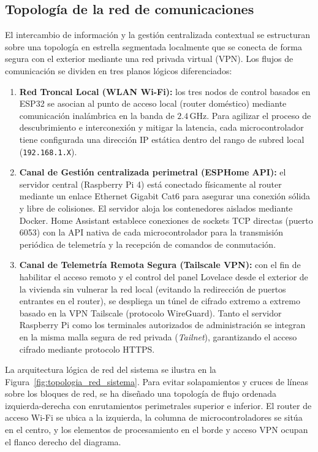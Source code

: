 \subsection{Topología de la red de comunicaciones}
\label{sec:topologia_red}

El intercambio de información y la gestión centralizada contextual se estructuran sobre una topología en estrella segmentada localmente que se conecta de forma segura con el exterior mediante una red privada virtual (VPN). Los flujos de comunicación se dividen en tres planos lógicos diferenciados:

\begin{enumerate}
    \item \textbf{Red Troncal Local (WLAN Wi-Fi):} los tres nodos de control basados en ESP32 se asocian al punto de acceso local (router doméstico) mediante comunicación inalámbrica en la banda de $2.4\,\text{GHz}$. Para agilizar el proceso de descubrimiento e interconexión y mitigar la latencia, cada microcontrolador tiene configurada una dirección IP estática dentro del rango de subred local (\texttt{192.168.1.X}).
    \item \textbf{Canal de Gestión centralizada perimetral (ESPHome API):} el servidor central (Raspberry Pi 4) está conectado físicamente al router mediante un enlace Ethernet Gigabit Cat6 para asegurar una conexión sólida y libre de colisiones. El servidor aloja los contenedores aislados mediante Docker. Home Assistant establece conexiones de sockets TCP directas (puerto 6053) con la API nativa de cada microcontrolador para la transmisión periódica de telemetría y la recepción de comandos de conmutación.
    \item \textbf{Canal de Telemetría Remota Segura (Tailscale VPN):} con el fin de habilitar el acceso remoto y el control del panel Lovelace desde el exterior de la vivienda sin vulnerar la red local (evitando la redirección de puertos entrantes en el router), se despliega un túnel de cifrado extremo a extremo basado en la VPN Tailscale (protocolo WireGuard). Tanto el servidor Raspberry Pi como los terminales autorizados de administración se integran en la misma malla segura de red privada (\textit{Tailnet}), garantizando el acceso cifrado mediante protocolo HTTPS.
\end{enumerate}

La arquitectura lógica de red del sistema se ilustra en la Figura~\ref{fig:topologia_red_sistema}. Para evitar solapamientos y cruces de líneas sobre los bloques de red, se ha diseñado una topología de flujo ordenada izquierda-derecha con enrutamientos perimetrales superior e inferior. El router de acceso Wi-Fi se ubica a la izquierda, la columna de microcontroladores se sitúa en el centro, y los elementos de procesamiento en el borde y acceso VPN ocupan el flanco derecho del diagrama.

